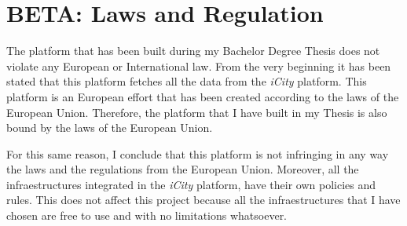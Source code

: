  
\section{BETA: Laws and Regulation}

The platform that has been built during my Bachelor Degree Thesis does not
violate any European or International law. From the very beginning it has been
stated that this platform fetches all the data from the {\it iCity} platform.
This platform is an European effort that has been created according to the laws
of the European Union. Therefore, the platform that I have built in my Thesis
is also bound by the laws of the European Union.

For this same reason, I conclude that this platform is not infringing in any
way the laws and the regulations from the European Union. Moreover, all the
infraestructures integrated in the {\it iCity} platform, have their own
policies and rules. This does not affect this project because all the
infraestructures that I have chosen are free to use and with no limitations
whatsoever.
